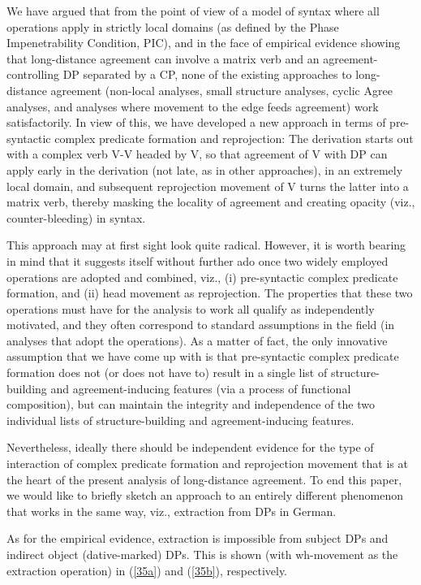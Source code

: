 \documentclass[output=paper
,modfonts
,nonflat]{langsci/langscibook}
\begin{document}
	We have argued that from the point of view of a model of syntax where
	all operations apply in strictly local domains (as defined by the
	Phase Impenetrability Condition, PIC), and in the face of empirical
	evidence showing that long-distance agreement can involve a matrix
	verb and an agreement-controlling DP separated by a CP, none of the
	existing approaches to long-distance agreement (non-local analyses,
	small structure analyses, cyclic Agree analyses, and analyses where
	movement to the edge feeds agreement) work satisfactorily. In view of
	this, we have developed a new approach in terms of pre-syntactic
	complex predicate formation and reprojection: The derivation starts
	out with a complex verb {V-V} headed by V, so that agreement
	of V with DP can apply early in the derivation (not late, as in
	other approaches), in an extremely local domain, and subsequent
	reprojection movement of V turns the latter into a matrix verb, thereby
	masking the locality of agreement and creating opacity (viz.,
	counter-bleeding) in syntax.  
	
	This approach may at first sight look quite radical. However, it is
	worth bearing in mind that it suggests itself without further ado once
	two widely employed operations are adopted and combined, viz., (i)
	pre-syntactic complex predicate formation, and (ii) head movement as
	reprojection. The properties that these two operations must have for
	the analysis to work all qualify as independently motivated, and they
	often correspond to standard assumptions in the field (in analyses
	that adopt the operations). As a matter of fact, the only innovative
	assumption that we have come up with is that pre-syntactic complex
	predicate formation does not (or does not have to) result in a single
	list of structure-building and agreement-inducing features (via a
	process of functional composition), but can maintain the integrity and
	independence of the two individual lists of structure-building and
	agreement-inducing features.
	
	Nevertheless, ideally there should be independent evidence for the
	type of interaction of complex predicate formation and reprojection
	movement that is at the heart of the present analysis of long-distance
	agreement. To end this paper, we would like to briefly sketch an
	approach to an entirely different phenomenon that works in the same
	way, viz., extraction from DPs in German. 
	
	As for the empirical evidence, extraction is impossible from subject
	DPs and indirect object (dative-marked) DPs. This is shown (with
	wh-movement as the extraction operation) in (\ref{35a}) and (\ref{35b}),
	respectively.
	
\end{document}
